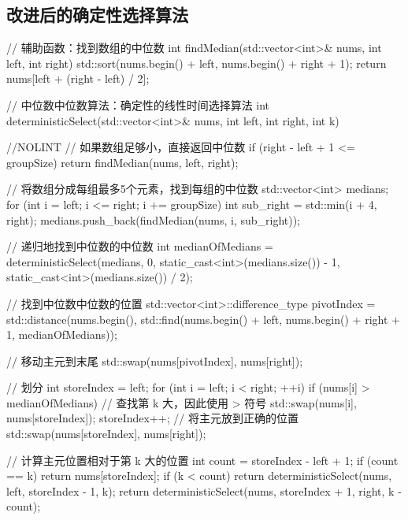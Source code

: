\subsection{改进后的确定性选择算法}
\begin{cppcode}
// 辅助函数：找到数组的中位数
int findMedian(std::vector<int>& nums, int left, int right) {
    std::sort(nums.begin() + left, nums.begin() + right + 1);
    return nums[left + (right - left) / 2];
}

// 中位数中位数算法：确定性的线性时间选择算法
int deterministicSelect(std::vector<int>& nums, int left, int right, int k) { //NOLINT
    // 如果数组足够小，直接返回中位数
    if (right - left + 1 <= groupSize) {
        return findMedian(nums, left, right);
    }

    // 将数组分成每组最多5个元素，找到每组的中位数
    std::vector<int> medians;
    for (int i = left; i <= right; i += groupSize) {
        int sub_right = std::min(i + 4, right);
        medians.push_back(findMedian(nums, i, sub_right));
    }

    // 递归地找到中位数的中位数
    int medianOfMedians = deterministicSelect(medians, 0, static_cast<int>(medians.size()) - 1, static_cast<int>(medians.size()) / 2);

    // 找到中位数中位数的位置
    std::vector<int>::difference_type pivotIndex = std::distance(nums.begin(), std::find(nums.begin() + left, nums.begin() + right + 1, medianOfMedians));

    // 移动主元到末尾
    std::swap(nums[pivotIndex], nums[right]);

    // 划分
    int storeIndex = left;
    for (int i = left; i < right; ++i) {
        if (nums[i] > medianOfMedians) { // 查找第 k 大，因此使用 > 符号
            std::swap(nums[i], nums[storeIndex]);
            storeIndex++;
        }
    }
    // 将主元放到正确的位置
    std::swap(nums[storeIndex], nums[right]);

    // 计算主元位置相对于第 k 大的位置
    int count = storeIndex - left + 1;
    if (count == k) {
        return nums[storeIndex];
    }
    if (k < count) {
        return deterministicSelect(nums, left, storeIndex - 1, k);
    }
    return deterministicSelect(nums, storeIndex + 1, right, k - count);
}
\end{cppcode}